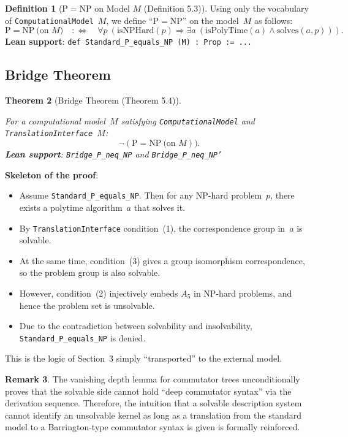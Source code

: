 \documentclass[11pt,a4paper]{article}
\theoremstyle{plain}
\newtheorem{theorem}{Theorem}[section]
\theoremstyle{definition}
\newtheorem{definition}[theorem]{Definition}
\newtheorem{remark}[theorem]{Remark}
\newcommand{\Aalt}{A_5}
\newcommand{\isPolyTime}{\mathrm{isPolyTime}}
\newcommand{\isNPHard}{\mathrm{isNPHard}}
\newcommand{\TranslationInterface}{\texttt{TranslationInterface}}
\newcommand{\ComputationalModel}{\texttt{ComputationalModel}}
\newcommand{\lean}[1]{\texttt{#1}}
\begin{document}
\begin{definition}[$\mathrm{P}=\mathrm{NP}$ on Model $M$ (Definition 5.3)]
\leavevmode\par\noindent
Using only the vocabulary of \ComputationalModel{}~$M$, we define ``$\mathrm{P}=\mathrm{NP}$'' on the model~$M$ as follows:
\[
\mathrm{P}=\mathrm{NP}\ \text{(on }M) \quad :\Longleftrightarrow \quad \forall p\ (\isNPHard(p) \Rightarrow \exists a\ (\isPolyTime(a) \wedge \mathrm{solves}(a,p))).
\]
\textbf{Lean support}: \lean{def Standard\_P\_equals\_NP (M) : Prop := ...}
\end{definition}

\subsection{Bridge Theorem}

\begin{theorem}[Bridge Theorem (Theorem 5.4)]\label{thm:bridge}
\leavevmode\par\noindent
For a computational model~$M$ satisfying \ComputationalModel{} and \TranslationInterface{}~$M$:
\[
\neg(\mathrm{P}=\mathrm{NP}\ \text{(on }M)).
\]
\textbf{Lean support}: \lean{Bridge\_P\_neq\_NP} and \lean{Bridge\_P\_neq\_NP'}
\end{theorem}

\textbf{Skeleton of the proof}:
\begin{itemize}[nosep]
\item Assume \lean{Standard\_P\_equals\_NP}. Then for any NP-hard problem~$p$, there exists a polytime algorithm~$a$ that solves it.
\item By \TranslationInterface{} condition~(1), the correspondence group in~$a$ is solvable.
\item At the same time, condition~(3) gives a group isomorphism correspondence, so the problem group is also solvable.
\item However, condition~(2) injectively embeds $\Aalt$ in NP-hard problems, and hence the problem set is unsolvable.
\item Due to the contradiction between solvability and insolvability, \lean{Standard\_P\_equals\_NP} is denied.
\end{itemize}
This is the logic of Section~3 simply ``transported'' to the external model.

\begin{remark}
The vanishing depth lemma for commutator trees unconditionally proves that the solvable side cannot hold ``deep commutator syntax'' via the derivation sequence. Therefore, the intuition that a solvable description system cannot identify an unsolvable kernel as long as a translation from the standard model to a Barrington-type commutator syntax is given is formally reinforced.
\end{remark}
\end{document}
